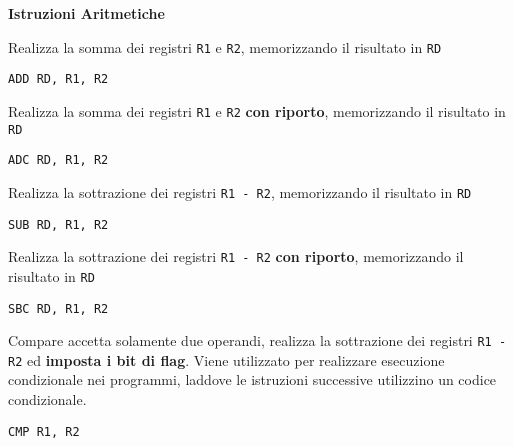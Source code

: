 \begin{defn}
\textbf{Istruzioni Aritmetiche}

	Realizza la somma dei registri \verb|R1| e \verb|R2|, memorizzando il risultato in \verb|RD|
	\begin{lstlisting}[style=arm]
	ADD RD, R1, R2
	\end{lstlisting}
	
	Realizza la somma dei registri \verb|R1| e \verb|R2| \textbf{con riporto}, memorizzando il risultato in \verb|RD|
	\begin{lstlisting}[style=arm]
	ADC RD, R1, R2
	\end{lstlisting}
	
	Realizza la sottrazione dei registri \verb|R1 - R2|, memorizzando il risultato in \verb|RD|
	\begin{lstlisting}[style=arm]
	SUB RD, R1, R2
	\end{lstlisting}
	
	Realizza la sottrazione dei registri \verb|R1 - R2| \textbf{con riporto}, memorizzando il risultato in \verb|RD|
	\begin{lstlisting}[style=arm]
	SBC RD, R1, R2
	\end{lstlisting}
	
	Compare accetta solamente due operandi, realizza la sottrazione dei registri \verb|R1 - R2| ed \textbf{imposta i bit di flag}. Viene utilizzato per realizzare esecuzione condizionale nei programmi, laddove le istruzioni successive utilizzino un codice condizionale.
	\begin{lstlisting}[style=arm]
	CMP R1, R2
	\end{lstlisting}

\end{defn}